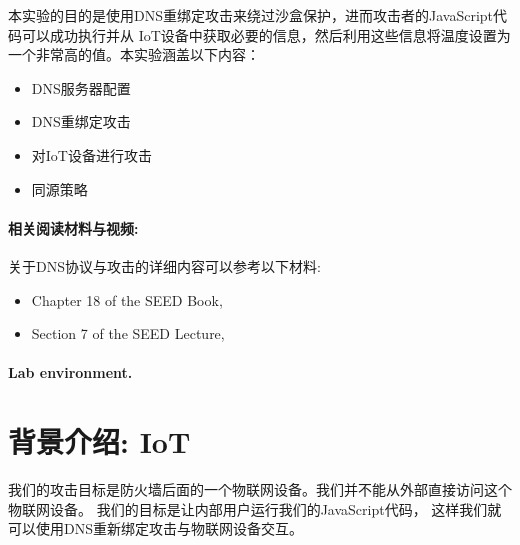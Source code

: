 本实验的目的是使用DNS重绑定攻击来绕过沙盒保护，进而攻击者的JavaScript代码可以成功执行并从
IoT设备中获取必要的信息，然后利用这些信息将温度设置为一个非常高的值。本实验涵盖以下内容：


\begin{itemize}[noitemsep]
\item DNS服务器配置
\item DNS重绑定攻击
\item 对IoT设备进行攻击
\item 同源策略
\end{itemize}


\paragraph{相关阅读材料与视频:}
关于DNS协议与攻击的详细内容可以参考以下材料:

\begin{itemize}
\item Chapter 18 of the SEED Book, \seedbook
\item Section 7 of the SEED Lecture, \seedisvideo
\end{itemize}


\paragraph{Lab environment.} \seedenvironment



\vspace{0.2in}
\noindent
{}





\section{背景介绍: IoT}

我们的攻击目标是防火墙后面的一个物联网设备。我们并不能从外部直接访问这个物联网设备。
我们的目标是让内部用户运行我们的JavaScript代码，
这样我们就可以使用DNS重新绑定攻击与物联网设备交互。



